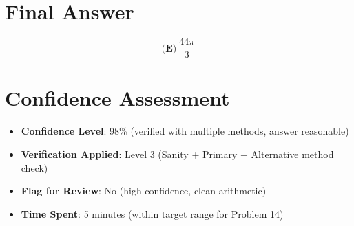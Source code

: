 \documentclass[]{article}
\begin{document}
\section*{Final Answer}
$$\boxed{\textbf{(E)}\ \frac{44\pi}{3}}$$

\section*{Confidence Assessment}
\begin{itemize}[leftmargin=*]
    \item \textbf{Confidence Level}: 98\% (verified with multiple methods, answer reasonable)
    \item \textbf{Verification Applied}: Level 3 (Sanity + Primary + Alternative method check)
    \item \textbf{Flag for Review}: No (high confidence, clean arithmetic)
    \item \textbf{Time Spent}: 5 minutes (within target range for Problem 14)
\end{itemize}
\end{document}
